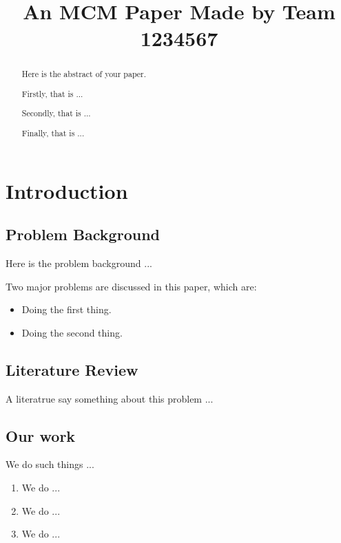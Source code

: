 \documentclass[12pt]{article}  %
\title{An MCM Paper Made by Team 1234567}  %
\begin{document}
\begin{abstract}
    Here is the abstract of your paper.

    Firstly, that is ...

    Secondly, that is ...

    Finally, that is ...


\end{abstract}

\maketitle  %
\tableofcontents  %


\section{Introduction}
\subsection{Problem Background}
Here is the problem background ...

Two major problems are discussed in this paper, which are:
\begin{itemize}
    \item Doing the first thing.
    \item Doing the second thing.
\end{itemize}

\subsection{Literature Review}
A literatrue\cite{1} say something about this problem ...

\subsection{Our work}
We do such things ...

\begin{enumerate}[\bfseries 1.]
    \item We do ...
    \item We do ...
    \item We do ...
\end{enumerate}
\end{document}

